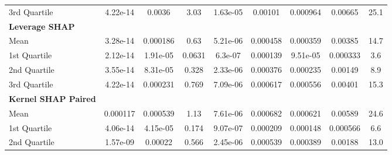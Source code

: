 {\begin{tabular} {lcccccccc}
\hspace{7pt}3rd Quartile & \cellcolor{silver!60}4.22e-14 & 0.0036 & 3.03 & 1.63e-05 & 0.00101 & \cellcolor{bronze!60}0.000964 & 0.00665 & 25.1 \\ 
\addlinespace[1ex] 
\textbf{Leverage SHAP} &  &  &  &  &  &  &  &  \\ 
\hspace{7pt}Mean & \cellcolor{bronze!60}3.28e-14 & \cellcolor{gold!60}0.000186 & \cellcolor{gold!60}0.63 & \cellcolor{gold!60}5.21e-06 & \cellcolor{silver!60}0.000458 & \cellcolor{gold!60}0.000359 & \cellcolor{silver!60}0.00385 & \cellcolor{silver!60}14.7 \\ 
\hspace{7pt}1st Quartile & \cellcolor{silver!60}2.12e-14 & \cellcolor{gold!60}1.91e-05 & \cellcolor{gold!60}0.0631 & \cellcolor{gold!60}6.3e-07 & \cellcolor{bronze!60}0.000139 & \cellcolor{silver!60}9.51e-05 & \cellcolor{silver!60}0.000333 & \cellcolor{silver!60}3.6 \\ 
\hspace{7pt}2nd Quartile & \cellcolor{bronze!60}3.55e-14 & \cellcolor{gold!60}8.31e-05 & \cellcolor{gold!60}0.328 & \cellcolor{gold!60}2.33e-06 & \cellcolor{silver!60}0.000376 & \cellcolor{gold!60}0.000235 & \cellcolor{bronze!60}0.00149 & \cellcolor{silver!60}8.9 \\ 
\hspace{7pt}3rd Quartile & \cellcolor{bronze!60}4.22e-14 & \cellcolor{gold!60}0.000231 & \cellcolor{gold!60}0.769 & \cellcolor{gold!60}7.09e-06 & \cellcolor{gold!60}0.000617 & \cellcolor{gold!60}0.000556 & \cellcolor{silver!60}0.00401 & \cellcolor{silver!60}15.3 \\ 
\addlinespace[1ex] 
\textbf{Kernel SHAP Paired} &  &  &  &  &  &  &  &  \\ 
\hspace{7pt}Mean & 0.000117 & \cellcolor{bronze!60}0.000539 & \cellcolor{bronze!60}1.13 & \cellcolor{silver!60}7.61e-06 & \cellcolor{bronze!60}0.000682 & \cellcolor{bronze!60}0.000621 & 0.00589 & 24.6 \\ 
\hspace{7pt}1st Quartile & 4.06e-14 & \cellcolor{bronze!60}4.15e-05 & \cellcolor{bronze!60}0.174 & \cellcolor{bronze!60}9.07e-07 & 0.000209 & 0.000148 & 0.000566 & 6.6 \\ 
\hspace{7pt}2nd Quartile & 1.57e-09 & \cellcolor{bronze!60}0.00022 & \cellcolor{bronze!60}0.566 & \cellcolor{silver!60}2.45e-06 & 0.000539 & 0.000389 & 0.00188 & 13.0 \\ 

\end{tabular}}
